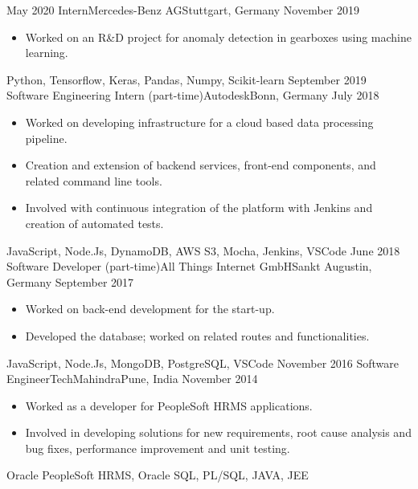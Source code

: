 %
%
%
\begin{experiences}
  \experience
  {May 2020} {Intern}{Mercedes-Benz AG}{Stuttgart, Germany}
  {November 2019} {
    \begin{itemize}
      \item Worked on an R\&D project for anomaly detection in gearboxes using machine learning.
    \end{itemize}
  }
  {Python, Tensorflow, Keras, Pandas, Numpy, Scikit-learn}
  \emptySeparator
  \experience
  {September 2019}   {Software Engineering Intern (part-time)}{Autodesk}{Bonn, Germany}
  {July 2018} {
    \begin{itemize}
      \item Worked on developing infrastructure for a cloud based data processing pipeline.
      \item Creation and extension of backend services, front-end components, and related command line tools.
      \item Involved with continuous integration of the platform with Jenkins and creation of automated tests.
    \end{itemize}
  }
  {JavaScript, Node.Js, DynamoDB, AWS S3, Mocha, Jenkins, VSCode}
  \emptySeparator
  \experience
  {June 2018} {Software Developer (part-time)}{All Things Internet GmbH}{Sankt Augustin, Germany}
  {September 2017}    {
    \begin{itemize}
      \item Worked on back-end development for the start-up.
      \item Developed the database; worked on related routes and functionalities.
    \end{itemize}
  }
  {JavaScript, Node.Js, MongoDB, PostgreSQL, VSCode}
  \emptySeparator
  \experience
  {November 2016}     {Software Engineer}{TechMahindra}{Pune, India}
  {November 2014}    {
    \begin{itemize}
      \item Worked as a developer for PeopleSoft HRMS applications.
      \item Involved in developing solutions for new requirements, root cause analysis and bug fixes, performance improvement and unit testing.
    \end{itemize}
  }
  {Oracle PeopleSoft HRMS, Oracle SQL, PL/SQL, JAVA, JEE}
\end{experiences}
